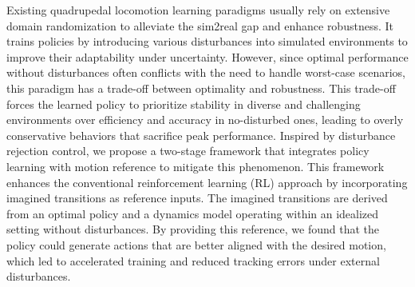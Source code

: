 Existing quadrupedal locomotion learning paradigms usually rely on extensive domain randomization to alleviate the sim2real gap and enhance robustness. It trains policies by introducing various disturbances into simulated environments to improve their adaptability under uncertainty. However, since optimal performance without disturbances often conflicts with the need to handle worst-case scenarios, this paradigm has a trade-off between optimality and robustness. This trade-off forces the learned policy to prioritize stability in diverse and challenging environments over efficiency and accuracy in no-disturbed ones, leading to overly conservative behaviors that sacrifice peak performance. Inspired by disturbance rejection control, we propose a two-stage framework that integrates policy learning with motion reference to mitigate this phenomenon. This framework enhances the conventional reinforcement learning (RL) approach by incorporating imagined transitions as reference inputs. The imagined transitions are derived from an optimal policy and a dynamics model operating within an idealized setting without disturbances. By providing this reference, we found that the policy could generate actions that are better aligned with the desired motion, which led to accelerated training and reduced tracking errors under external disturbances.